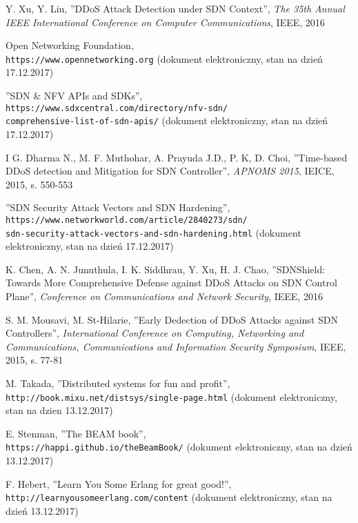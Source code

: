 \begin{thebibliography}{99}
Y. Xu, Y. Liu,
''DDoS Attack Detection under SDN Context'',
\textit{The 35th Annual IEEE International Conference on Computer
  Communications}, 
IEEE, 2016

Open Networking Foundation,
\\\texttt{https://www.opennetworking.org} (dokument elektroniczny, stan
na dzień 17.12.2017)

''SDN \& NFV APIs and SDKs'',
\\\texttt{https://www.sdxcentral.com/directory/nfv-sdn/
  \\comprehensive-list-of-sdn-apis/}
(dokument elektroniczny, stan na dzień 17.12.2017)

I G. Dharma N., M. F. Muthohar, A. Prayuda J.D., P. K, D. Choi,
''Time-based DDoS detection and Mitigation for SDN Controller'',
\textit{APNOMS 2015}, 
IEICE, 2015, s. 550-553

''SDN Security Attack Vectors and SDN Hardening'',
\\\texttt{https://www.networkworld.com/article/2840273/sdn/
  \\sdn-security-attack-vectors-and-sdn-hardening.html}
(dokument elektroniczny, stan na dzień 17.12.2017) 

K. Chen, A. N. Junuthula, I. K. Siddhrau, Y. Xu, H. J. Chao,
''SDNShield: Towards More Comprehensive Defense against DDoS Attacks on SDN
Control Plane'', 
\textit{Conference on Communications and Network Security},
IEEE, 2016

S. M. Mousavi, M. St-Hilarie,
''Early Dedection of DDoS Attacks against SDN Controllers'',
\textit{International Conference on Computing, Networking and Communications,
  Communications and Information Security Symposium},
IEEE, 2015, s. 77-81

M. Takada,
''Distributed systems for fun and profit'',
\\\texttt{http://book.mixu.net/distsys/single-page.html} (dokument
elektroniczny, stan na dzien 13.12.2017)

E. Stenman,
''The BEAM book'',
\\\texttt{https://happi.github.io/theBeamBook/} (dokument elektroniczny, stan na
dzień 13.12.2017)

F. Hebert,
''Learn You Some Erlang for great good!'',
\\\texttt{http://learnyousomeerlang.com/content} (dokument elektroniczny, stan
na dzień 13.12.2017)


\end{thebibliography}
